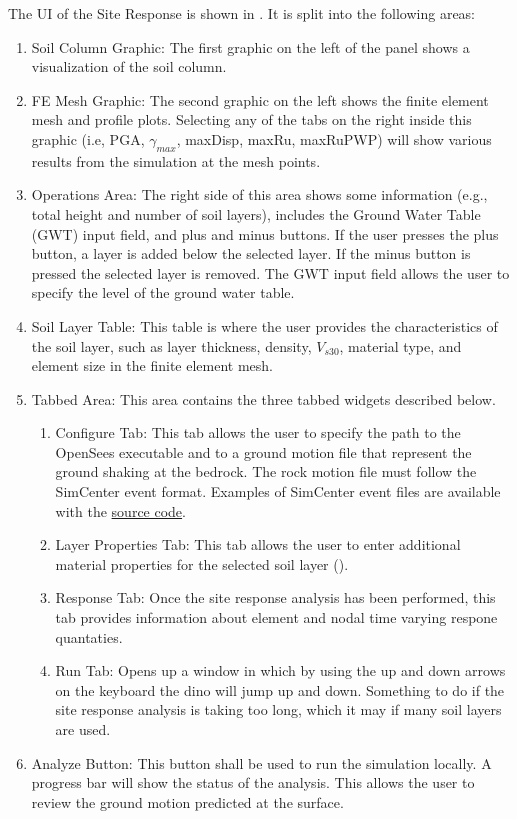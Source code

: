The UI of the Site Response is shown in . It is split into the following areas:
\begin{enumerate}
\item Soil Column Graphic: The first graphic on the left of the panel shows a visualization of the soil column.
\item FE Mesh Graphic: The second graphic on the left shows 
the finite element mesh and profile plots. Selecting any of the tabs on the right inside this graphic (i.e, PGA, $\gamma_{max}$, maxDisp, maxRu, maxRuPWP) will show various results
from the simulation at the mesh points.
\item Operations Area: The right side of this area shows some information (e.g., total height and number of soil layers), includes the Ground Water Table (GWT) input field, and plus and minus buttons. If the user presses the plus button, a layer is added below the selected layer. If the minus button is pressed the selected layer is removed. The GWT input field allows the user to specify the level of the ground water table.
\item Soil Layer Table: This table is where the user provides the characteristics of the soil layer, such as layer thickness, density, $V_{s30}$, material type, and element size in the finite element mesh.
\item Tabbed Area: This area contains the three tabbed widgets described below.

\begin{enumerate}
  \item Configure Tab: This tab allows the user to specify the path to the OpenSees executable and to a ground motion file that represent the ground shaking at the bedrock. The rock motion file must follow the SimCenter event format. Examples of SimCenter event files are available with the \href{https://github.com/NHERI-SimCenter/EE-UQ/tree/master/example1/event}{source code}.
  \item Layer Properties Tab: This tab allows the user to enter additional material properties for the selected soil layer ().
  \item Response Tab: Once the site response analysis has been performed, this tab provides information about element and nodal time varying respone quantaties.
  \item Run Tab: Opens up a window in which by using the up and down arrows on the keyboard the dino will jump up and down. Something to do if the site response analysis is taking too long, which it may if many soil layers are used.
\end{enumerate}

\item Analyze Button: This button shall be used to run the simulation locally. A progress bar will show the status of the analysis. This allows the user to review the ground motion predicted at the surface.
\end{enumerate}

